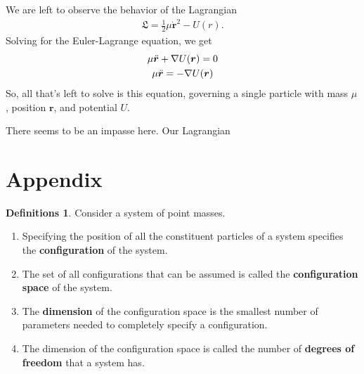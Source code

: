 \documentclass[10pt, psamsfonts]{amsart}
\theoremstyle{definition}
\newtheorem{defns}[thm]{Definitions}
\theoremstyle{remark}
\numberwithin{equation}{section}
\begin{document}
We are left to observe the behavior of the Lagrangian
\begin{align}
  \label{eq:One Param Lag}
  \mathfrak{L} = \frac{1}{2} \mu \dot{\bm{r}}^2 - U(r).
\end{align}
Solving for the Euler-Lagrange equation, we get
\begin{gather}
  \label{eq:One Param EL}
  \mu \ddot{\bm{r}} + \nabla U(\bm{r}) = 0 \notag \\
  \mu \ddot{\bm{r}} = -\nabla U(\bm{r})
\end{gather}
\noindent So, all that's left to solve is this equation, governing a single particle with mass $\mu$, position $\bm{r}$, and potential $U$.

There seems to be an impasse here. Our Lagrangian


\newpage
\section{Appendix}
\appendix
\begin{defns}
  Consider a system of point masses. 
  \begin{enumerate}
    \item Specifying the position of all the constituent particles of a system specifies the \textbf{configuration} of the system.
    \item The set of all configurations that can be assumed is called the \textbf{configuration space} of the system.
    \item The \textbf{dimension} of the configuration space is the smallest number of parameters needed to completely specify a configuration.
    \item The dimension of the configuration space is called the number of \textbf{degrees of freedom} that a system has.
  \end{enumerate}
\end{defns}
\end{document}
